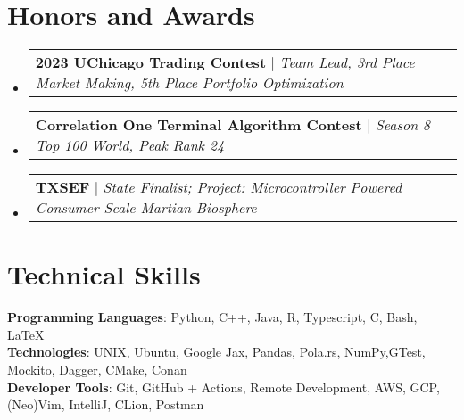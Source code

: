 \documentclass[letterpaper,11pt]{article}
\makeatletter
\newcommand{\resumeProjectHeading}[2]{
    \item
    \begin{tabular*}{0.97\textwidth}{l@{\extracolsep{\fill}}r}
      \small#1 & #2 \\
    \end{tabular*}\vspace{-7pt}
}
\newcommand{\resumeSubHeadingListStart}{\begin{itemize}[leftmargin=0.15in, label={}]}
\newcommand{\resumeSubHeadingListEnd}{\end{itemize}}
\makeatother
\begin{document}
\section{Honors and Awards}
    \resumeSubHeadingListStart
      \resumeProjectHeading
          {\textbf{2023 UChicago Trading Contest} $|$ \emph{Team Lead, 3rd Place Market Making, 5th Place Portfolio Optimization}}{}
      \resumeProjectHeading
          {\textbf{Correlation One Terminal Algorithm Contest} $|$ \emph{Season 8 Top 100 World, Peak Rank 24}}{}
      \resumeProjectHeading
          {\textbf{TXSEF} $|$ \emph{State Finalist; Project: Microcontroller Powered Consumer-Scale Martian Biosphere}}{}
    \resumeSubHeadingListEnd

%
\section{Technical Skills}
 \begin{itemize}[leftmargin=0.15in, label={}]
    \small{\item{
     \textbf{Programming Languages}{: Python, C++, Java, R, Typescript, C, Bash, \LaTeX} \\
     \textbf{Technologies}{: UNIX, Ubuntu, Google Jax, Pandas, Pola.rs, NumPy,GTest, Mockito, Dagger, CMake, Conan } \\
    \textbf{Developer Tools}{: Git, GitHub + Actions, Remote Development, AWS, GCP, (Neo)Vim, IntelliJ, CLion, Postman} \\
    }}
 \end{itemize}


\end{document}
